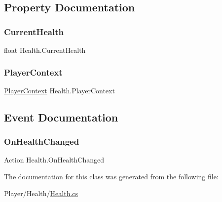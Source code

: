 \subsection{Property Documentation}
\mbox{\label{class_health_a11b1051941751e881065ecc8f87045af}} 
\subsubsection{\texorpdfstring{Current\+Health}{CurrentHealth}}
{\footnotesize\ttfamily float Health.\+Current\+Health\hspace{0.3cm}{\ttfamily [get]}}

\mbox{\label{class_health_ae265f425011ff7c815be2719e4b7d9bd}} 
\subsubsection{\texorpdfstring{Player\+Context}{PlayerContext}}
{\footnotesize\ttfamily \mbox{\hyperlink{class_player_context}{Player\+Context}} Health.\+Player\+Context\hspace{0.3cm}{\ttfamily [get]}}



\subsection{Event Documentation}
\mbox{\label{class_health_a49e530e913ac9ee7bb470c45e514e8c4}} 
\subsubsection{\texorpdfstring{On\+Health\+Changed}{OnHealthChanged}}
{\footnotesize\ttfamily Action Health.\+On\+Health\+Changed}



The documentation for this class was generated from the following file\+:\begin{DoxyCompactItemize}
\item 
Player/\+Health/\mbox{\hyperlink{_health_8cs}{Health.\+cs}}\end{DoxyCompactItemize}
